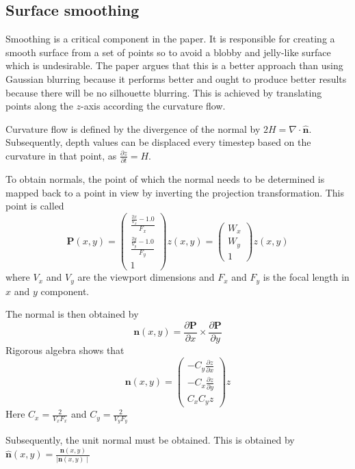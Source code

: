 \subsection{Surface smoothing}
Smoothing is a critical component in the paper. It is responsible for creating a smooth surface from a set of points so to avoid a blobby and jelly-like surface which is undesirable. The paper argues that this is a better approach than using Gaussian blurring because it performs better and ought to produce better results because there will be no silhouette blurring. 
This is achieved by translating points along the $z$-axis according the curvature flow. 

Curvature flow is defined by the divergence of the normal by \(2H = \nabla \cdot \hat{\mathbf{n}}\). Subsequently, depth values can be displaced every timestep based on the curvature in that point, as \(\frac{\partial z}{\partial t} = H\).

To obtain normals, the point of which the normal needs to be determined is mapped back to a point in view by inverting the projection transformation. This point is called \[\mathbf{P}(x, y) = \begin{pmatrix}\frac{\frac{2x}{V_x} - 1.0}{F_x}\\\frac{\frac{2y}{V_y} - 1.0}{F_y}\\1\end{pmatrix}z(x,y) = \begin{pmatrix}W_x\\W_y\\1\end{pmatrix}z(x,y)\] where \(V_x\) and \(V_y\) are the viewport dimensions and \(F_x\) and \(F_y\) is the focal length in \(x\) and \(y\) component.

The normal is then obtained by \[\mathbf{n}(x,y) = \frac{\partial \mathbf{P}}{\partial x} \times \frac{\partial \mathbf{P}}{\partial y}\]
Rigorous algebra shows that 
\begin{equation}
	\label{eq:normals}
	\mathbf{n}(x,y) = \begin{pmatrix}-C_y\frac{\partial z}{\partial x}\\-C_x\frac{\partial z}{\partial y}\\C_xC_yz\end{pmatrix}z
\end{equation}
Here \(C_x = \frac{2}{V_xF_x}\) and \(C_y = \frac{2}{V_yF_y}\) 

Subsequently, the unit normal must be obtained. This is obtained by \(\hat{\mathbf{n}}(x,y) = \frac{\mathbf{n}(x,y)}{\mid \mathbf{n}(x,y)\mid}\)

